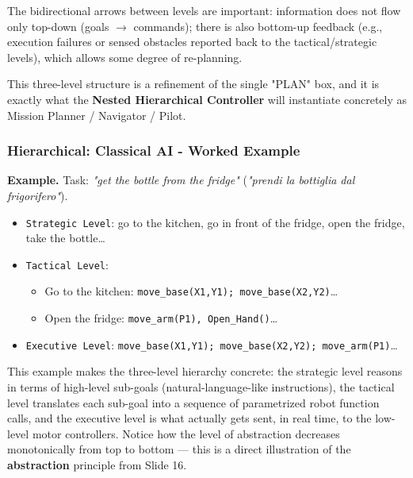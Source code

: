  The bidirectional arrows between levels are important: information does not flow only top-down (goals $\rightarrow$ commands); there is also bottom-up feedback (e.g., execution failures or sensed obstacles reported back to the tactical/strategic levels), which allows some degree of re-planning. 
 
 This three-level structure is a refinement of the single "PLAN" box, and it is exactly what the \textbf{Nested Hierarchical Controller} will instantiate concretely as Mission Planner / Navigator / Pilot.

\subsubsection{ Hierarchical: Classical AI - Worked Example}

\textbf{Example.} Task: \textit{"get the bottle from the fridge"} (\textit{"prendi la bottiglia dal frigorifero"}).

\begin{itemize}
    \item \texttt{Strategic Level}: go to the kitchen, go in front of the fridge, open the fridge, take the bottle\ldots

    \vspace{0.2cm}
    \item \texttt{Tactical Level}:
    \begin{itemize}
        \item Go to the kitchen: \texttt{move\_base(X1,Y1); move\_base(X2,Y2)}\ldots
        \item Open the fridge: \texttt{move\_arm(P1), Open\_Hand()}\ldots
    \end{itemize}

    \vspace{0.2cm}
    \item \texttt{Executive Level}: \texttt{move\_base(X1,Y1); move\_base(X2,Y2); move\_arm(P1)}\ldots
\end{itemize}

 This example makes the three-level hierarchy concrete: the strategic level reasons in terms of high-level sub-goals (natural-language-like instructions), the tactical level translates each sub-goal into a sequence of parametrized robot function calls, and the executive level is what actually gets sent, in real time, to the low-level motor controllers. Notice how the level of abstraction decreases monotonically from top to bottom — this is a direct illustration of the \textbf{abstraction} principle from Slide 16.

